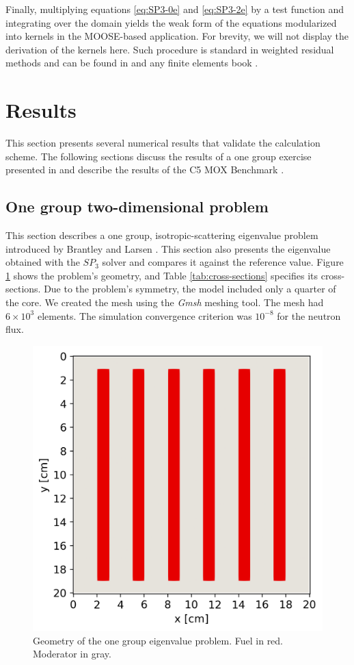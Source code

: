 \documentclass{anstrans}
\begin{document}
Finally, multiplying equations \ref{eq:SP3-0e} and \ref{eq:SP3-2e} by a test function and integrating over the domain yields the weak form of the equations modularized into kernels in the MOOSE-based application.
For brevity, we will not display the derivation of the kernels here.
Such procedure is standard in weighted residual methods and can be found in \cite{ryu_finite_2013} and any finite elements book \cite{quarteroni_numerical_1994}.


\section{Results}

This section presents several numerical results that validate the calculation scheme.
The following sections discuss the results of a one group exercise presented in \cite{brantley_simplifiedP3_2000} and describe the results of the C5 MOX Benchmark \cite{cavarec_benchmark_1994}.

\subsection{One group two-dimensional problem}

This section describes a one group, isotropic-scattering eigenvalue problem introduced by Brantley and Larsen \cite{brantley_simplifiedP3_2000}.
This section also presents the eigenvalue obtained with the $SP_3$ solver and compares it against the reference value.
Figure \ref{fig:2D} shows the problem's geometry, and Table \ref{tab:cross-sections} specifies its cross-sections.
Due to the problem's symmetry, the model included only a quarter of the core.
We created the mesh using the \textit{Gmsh} \cite{geuzaine_gmsh_2009} meshing tool.
The mesh had $6 \times 10^{3}$ elements.
The simulation convergence criterion was $10^{-8}$ for the neutron flux.

\begin{figure}[H] %
    \centering
    \includegraphics[width=0.8\linewidth]{figures/mesh2.png}
    \hfill
    \caption{Geometry of the one group eigenvalue problem. Fuel in red. Moderator in gray.}
    \label{fig:2D}
\end{figure}
\end{document}
